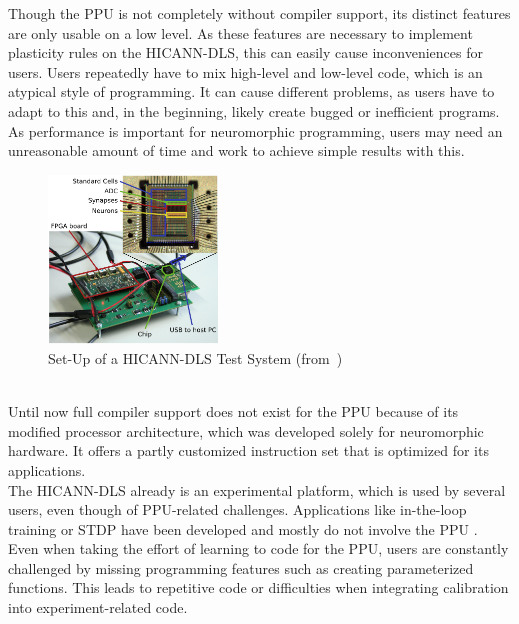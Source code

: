 Though the \ac{PPU} is not completely without compiler support, its distinct features are only usable on a low level.
As these features are necessary to implement plasticity rules on the \ac{HICANN-DLS}, this can easily cause inconveniences for users.
Users repeatedly have to mix high-level and low-level code, which is an atypical style of programming.
It can cause different problems, as users have to adapt to this and, in the beginning, likely create bugged or inefficient programs.
As performance is important for neuromorphic programming, users may need an unreasonable amount of time and work to achieve simple results with this.
\\
\begin{figure}
\captionsetup{format=plain, indention=.6cm, labelsep=newline,singlelinecheck=false}
    \centering
    \includegraphics[width=0.4\textwidth]{pictures/Fig1.png}
    \caption{\label{fig:dlsboard} Set-Up of a \ac{HICANN-DLS} Test System (from~\citeauthor{PPU})}
\end{figure}
\\
Until now full compiler support does not exist for the \ac{PPU} because of its modified processor architecture, which was developed solely for neuromorphic hardware.
It offers a partly customized instruction set that is optimized for its applications.
\\
The \ac{HICANN-DLS} already is an experimental platform, which is used by several users, even though of \ac{PPU}-related challenges.
Applications like in-the-loop training or \ac{STDP} have been developed and mostly do not involve the \ac{PPU} .
Even when taking the effort of learning to code for the \ac{PPU}, users are constantly challenged by missing programming features such as creating parameterized functions.
This leads to repetitive code or difficulties when integrating calibration into experiment-related code.

